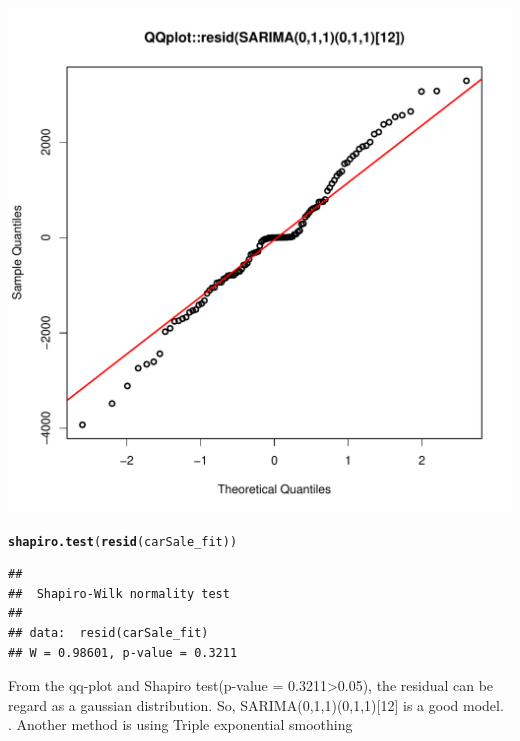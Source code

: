 \documentclass[10pt]{article}\usepackage[]{graphicx}\usepackage[]{color}
\makeatletter
\def\maxwidth{ %
  \ifdim\Gin@nat@width>\linewidth
    \linewidth
  \else
    \Gin@nat@width
  \fi
}
\newcommand{\hlstd}[1]{\textcolor[rgb]{0.345,0.345,0.345}{#1}}%
\newcommand{\hlkwd}[1]{\textcolor[rgb]{0.737,0.353,0.396}{\textbf{#1}}}%
\newenvironment{kframe}{%
 \def\at@end@of@kframe{}%
 \ifinner\ifhmode%
  \def\at@end@of@kframe{\end{minipage}}%
  \begin{minipage}{\columnwidth}%
 \fi\fi%
 \def\FrameCommand##1{\hskip\@totalleftmargin \hskip-\fboxsep
 \colorbox{shadecolor}{##1}\hskip-\fboxsep
     \hskip-\linewidth \hskip-\@totalleftmargin \hskip\columnwidth}%
 \MakeFramed {\advance\hsize-\width
   \@totalleftmargin\z@ \linewidth\hsize
   \@setminipage}}%
 {\par\unskip\endMakeFramed%
 \at@end@of@kframe}
\newenvironment{knitrout}{}{} %
\makeatother
\begin{document}
\begin{knitrout}
\begin{kframe}
\end{kframe}
\includegraphics[width=\maxwidth]{figure/unnamed-chunk-36-3} 
\begin{kframe}\begin{alltt}
\hlkwd{shapiro.test}\hlstd{(}\hlkwd{resid}\hlstd{(carSale_fit))}
\end{alltt}
\begin{verbatim}
## 
## 	Shapiro-Wilk normality test
## 
## data:  resid(carSale_fit)
## W = 0.98601, p-value = 0.3211
\end{verbatim}
\end{kframe}
\end{knitrout}
From the qq-plot and Shapiro test(p-value = 0.3211>0.05), the residual can be regard as a gaussian distribution.
So, SARIMA(0,1,1)(0,1,1)[12] is a good model.
. Another method is using Triple exponential smoothing
\end{document}
